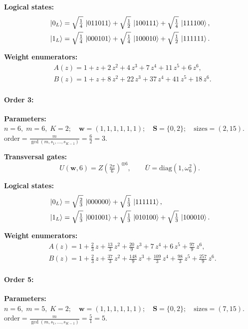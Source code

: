 \documentclass[pdflatex,sn-nature]{sn-jnl}%
\theoremstyle{thmstyleone}%
\theoremstyle{thmstyletwo}%
\theoremstyle{thmstylethree}%
\begin{document}
\begin{appendices}
\noindent\textbf{Logical states:}
\begin{align*}
    &\ket{0_L} = \sqrt{\tfrac{1}{4}}\,\ket{011011} + \sqrt{\tfrac{1}{2}}\,\ket{100111} + \sqrt{\tfrac{1}{4}}\,\ket{111100}, \\
    &\ket{1_L} = \sqrt{\tfrac{1}{4}}\,\ket{000101} + \sqrt{\tfrac{1}{4}}\,\ket{100010} + \sqrt{\tfrac{1}{2}}\,\ket{111111}.
\end{align*}

\noindent\textbf{Weight enumerators:}
\begin{align*}
    &A(z) = 1 + z + 2\,z^{2} + 4\,z^{3} + 7\,z^{4} + 11\,z^{5} + 6\,z^{6}, \\
    &B(z) = 1 + z + 8\,z^{2} + 22\,z^{3} + 37\,z^{4} + 41\,z^{5} + 18\,z^{6}.
\end{align*}


\paragraph{\textbf{Order 3:}}
\noindent\textbf{Parameters:} $n=6,\; m=6,\; K=2;\quad \mathbf w=(1, 1, 1, 1, 1, 1);\quad \mathbf S=\{0, 2\};\quad \text{sizes}=\left(2, 15\right).$\\[4pt]
$\displaystyle \text{order}=\frac{m}{\gcd(m,s_1,\dots,s_{K-1})}=\frac{6}{2}=3.$

\noindent\textbf{Transversal gates:}
\[
    U(\mathbf w,6)=Z \left(\tfrac{2\pi}{6}\right)^{\otimes6},\qquad
    \overline U=\mathrm{diag}(1,\omega_{6}^{2}).
\]

\noindent\textbf{Logical states:}
\begin{align*}
    &\ket{0_L} = \sqrt{\tfrac{2}{3}}\,\ket{000000} + \sqrt{\tfrac{1}{3}}\,\ket{111111}, \\
    &\ket{1_L} = \sqrt{\tfrac{1}{3}}\,\ket{001001} + \sqrt{\tfrac{1}{3}}\,\ket{010100} + \sqrt{\tfrac{1}{3}}\,\ket{100010}.
\end{align*}

\noindent\textbf{Weight enumerators:}
\begin{align*}
    &A(z) = 1 + \tfrac{2}{3}\,z + \tfrac{13}{3}\,z^{2} + \tfrac{20}{9}\,z^{3} + 7\,z^{4} + 6\,z^{5} + \tfrac{97}{9}\,z^{6}, \\
    &B(z) = 1 + \tfrac{2}{3}\,z + \tfrac{37}{3}\,z^{2} + \tfrac{148}{9}\,z^{3} + \tfrac{109}{3}\,z^{4} + \tfrac{98}{3}\,z^{5} + \tfrac{257}{9}\,z^{6}.
\end{align*}

\paragraph{\textbf{Order 5:}}
\noindent\textbf{Parameters:} $n=6,\; m=5,\; K=2;\quad \mathbf w=(1, 1, 1, 1, 1, 1);\quad \mathbf S=\{0, 2\};\quad \text{sizes}=\left(7, 15\right).$ $\displaystyle \text{order}=\frac{m}{\gcd(m,s_1,\dots,s_{K-1})}=\frac{5}{1}=5.$


\end{appendices}
\end{document}
